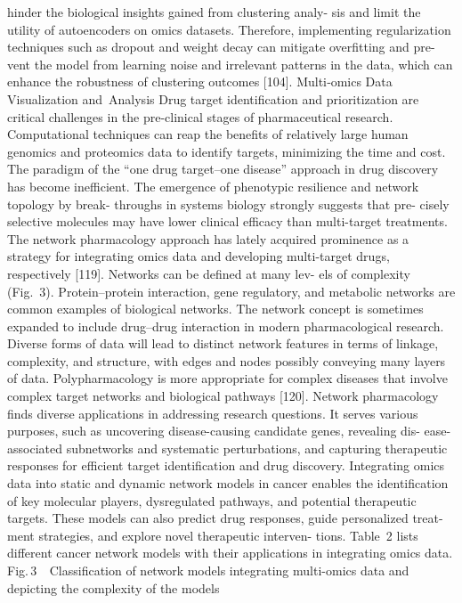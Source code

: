 hinder the biological insights gained from clustering analy-
sis and limit the utility of autoencoders on omics datasets.
Therefore, implementing regularization techniques such as
dropout and weight decay can mitigate overfitting and pre-
vent the model from learning noise and irrelevant patterns
in the data, which can enhance the robustness of clustering
outcomes [104].
Multi‑omics Data Visualization and Analysis
Drug target identification and prioritization are critical
challenges in the pre-clinical stages of pharmaceutical
research. Computational techniques can reap the benefits
of relatively large human genomics and proteomics data
to identify targets, minimizing the time and cost. The
paradigm of the “one drug target–one disease” approach
in drug discovery has become inefficient. The emergence
of phenotypic resilience and network topology by break-
throughs in systems biology strongly suggests that pre-
cisely selective molecules may have lower clinical efficacy
than multi-target treatments. The network pharmacology
approach has lately acquired prominence as a strategy for
integrating omics data and developing multi-target drugs,
respectively [119]. Networks can be defined at many lev-
els of complexity (Fig. 3). Protein–protein interaction,
gene regulatory, and metabolic networks are common
examples of biological networks. The network concept is
sometimes expanded to include drug–drug interaction in
modern pharmacological research. Diverse forms of data
will lead to distinct network features in terms of linkage,
complexity, and structure, with edges and nodes possibly
conveying many layers of data. Polypharmacology is more
appropriate for complex diseases that involve complex
target networks and biological pathways [120]. Network
pharmacology finds diverse applications in addressing
research questions. It serves various purposes, such as
uncovering disease-causing candidate genes, revealing dis-
ease-associated subnetworks and systematic perturbations,
and capturing therapeutic responses for efficient target
identification and drug discovery. Integrating omics data
into static and dynamic network models in cancer enables
the identification of key molecular players, dysregulated
pathways, and potential therapeutic targets. These models
can also predict drug responses, guide personalized treat-
ment strategies, and explore novel therapeutic interven-
tions. Table 2 lists different cancer network models with
their applications in integrating omics data.
Fig. 3   Classification of network models integrating multi-omics data and depicting the complexity of the models
